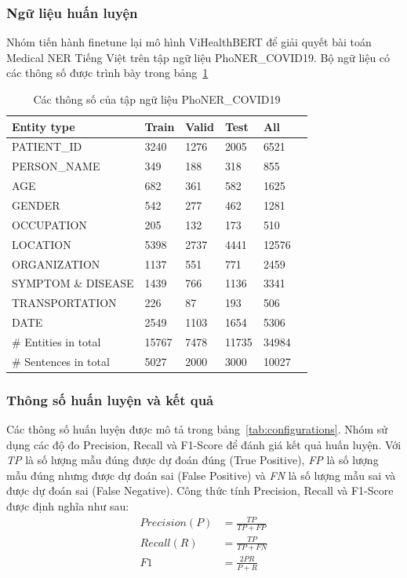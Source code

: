 \subsubsection{Ngữ liệu huấn luyện}
Nhóm tiến hành finetune lại mô hình ViHealthBERT để giải quyết bài toán Medical NER Tiếng Việt trên tập ngữ liệu PhoNER\_COVID19\cite{truong-etal-2021-covid}. Bộ ngữ liệu có các thông số được trình bày trong bảng~\ref{tab:covid-ner-vietnamese-stats}
\begin{table}
\centering
\begin{tabular}{|l|l|l|l|l|l|}
\hline
\textbf{Entity type} & \textbf{Train} & \textbf{Valid} & \textbf{Test} & \textbf{All} \\
\hline
PATIENT\_ID & 3240 & 1276 & 2005 & 6521 \\
\hdashline
PERSON\_NAME & 349 & 188 & 318 & 855 \\
\hdashline
AGE & 682 & 361 & 582 & 1625 \\
\hdashline
GENDER & 542 & 277 & 462 & 1281 \\
\hdashline
OCCUPATION & 205 & 132 & 173 & 510 \\
\hdashline
LOCATION & 5398 & 2737 & 4441 & 12576 \\
\hdashline
ORGANIZATION & 1137 & 551 & 771 & 2459 \\
\hdashline
SYMPTOM \& DISEASE & 1439 & 766 & 1136 & 3341 \\
\hdashline
TRANSPORTATION & 226 & 87 & 193 & 506 \\
\hdashline
DATE & 2549 & 1103 & 1654 & 5306 \\
\hline
\# Entities in total & 15767 & 7478 & 11735 & 34984 \\
\hline
\# Sentences in total & 5027 & 2000 & 3000 & 10027 \\
\hline
\end{tabular}
\caption{Các thông số của tập ngữ liệu PhoNER\_COVID19\cite{truong-etal-2021-covid}}
\label{tab:covid-ner-vietnamese-stats}
\end{table}

\subsubsection{Thông số huấn luyện và kết quả}
Các thông số huấn luyện được mô tả trong bảng~\ref{tab:configurations}. Nhóm sử dụng các độ đo Precision, Recall và F1-Score để đánh giá kết quả huấn luyện. Với \textit{TP} là số lượng mẫu đúng được dự đoán đúng (True Positive), \textit{FP} là số lượng mẫu đúng nhưng được dự đoán sai (False Positive) và \textit{FN} là số lượng mẫu sai và được dự đoán sai (False Negative). Công thức tính Precision, Recall và F1-Score được định nghĩa như sau:
\begin{equation*}
\begin{aligned}
Precision (P) &= \frac{TP}{TP + FP} \\
Recall (R) &= \frac{TP}{TP + FN} \\
F1 &= \frac{2PR}{P + R}
\end{aligned}
\end{equation*}

